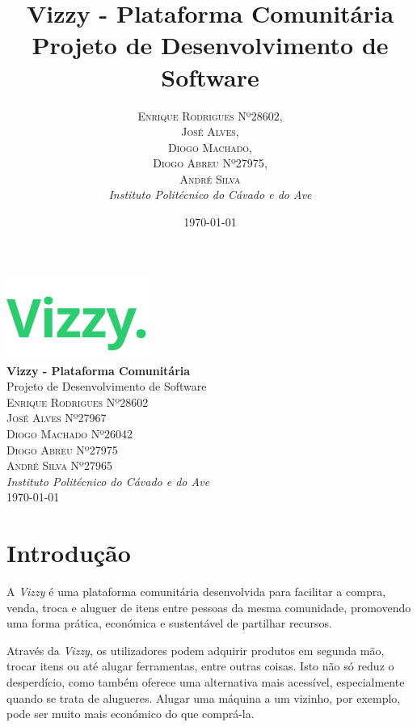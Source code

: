\documentclass[a4paper, 12pt]{article} %
\title{\textbf{Vizzy - Plataforma Comunitária}\\ %
	Projeto de Desenvolvimento de Software} %
\author{
	\textsc{Enrique Rodrigues Nº28602}, \\
	\textsc{José Alves}, \\
	\textsc{Diogo Machado}, \\
	\textsc{Diogo Abreu Nº27975}, \\ 
	\textsc{André Silva} \\
	\textit{Instituto Politécnico do Cávado e do Ave}
}
\date{\today} %
\renewcommand{\maketitle}{
\begin{titlepage}
\begin{center}
\vspace*{1cm}
\includegraphics[width=0.35\textwidth]{../images/logo-no-bg.png}\\[1cm] %
{\Huge\textbf{Vizzy - Plataforma Comunitária}}\\[0.5cm] %
{\Large Projeto de Desenvolvimento de Software}\\[2cm] %
{\large \textsc{
	Enrique Rodrigues Nº28602 \\
	José Alves Nº27967 \\
	Diogo Machado Nº26042 \\
	Diogo Abreu Nº27975 \\
	André Silva Nº27965}}\\[0.5cm] %
{\textit{Instituto Politécnico do Cávado e do Ave}}\\[1.5cm] %
{\large \today} %
\vfill
\end{center}
\end{titlepage}
}
\begin{document}
\maketitle %







\newpage
\renewcommand{\contentsname}{Indice}
\tableofcontents
\newpage
\renewcommand{\listfigurename}{Lista de Figuras}
\listoffigures
\newpage
\section{Introdução}

A \textit{Vizzy} é uma plataforma comunitária desenvolvida para facilitar a compra, venda, troca e aluguer de itens entre pessoas da mesma comunidade, promovendo uma forma prática, económica e sustentável de partilhar recursos.

Através da \textit{Vizzy}, os utilizadores podem adquirir produtos em segunda mão, trocar itens ou até alugar ferramentas, entre outras coisas. Isto não só reduz o desperdício, como também oferece uma alternativa mais acessível, especialmente quando se trata de alugueres. Alugar uma máquina a um vizinho, por exemplo, pode ser muito mais económico do que comprá-la.
\end{document}
